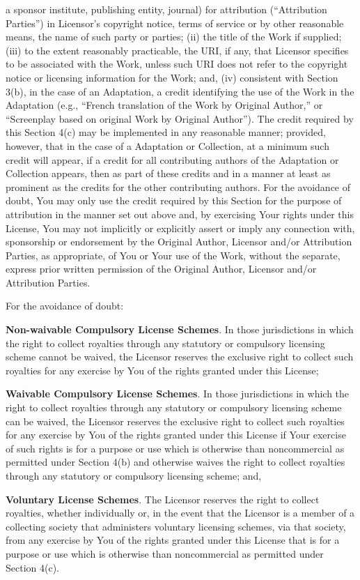 \begin{doclicense@enumerate}
a sponsor institute, publishing entity, journal) for
attribution (``Attribution Parties'') in Licensor's
copyright notice, terms of service or by other reasonable
means, the name of such party or parties; (ii) the title
of the Work if supplied; (iii) to the extent reasonably
practicable, the URI, if any, that Licensor specifies to
be associated with the Work, unless such URI does not
refer to the copyright notice or licensing information
for the Work; and, (iv) consistent with Section 3(b), in
the case of an Adaptation, a credit identifying the use
of the Work in the Adaptation (e.g., ``French translation
of the Work by Original Author,'' or ``Screenplay based on
original Work by Original Author''). The credit required
by this Section 4(c) may be implemented in any reasonable
manner; provided, however, that in the case of a
Adaptation or Collection, at a minimum such credit will
appear, if a credit for all contributing authors of the
Adaptation or Collection appears, then as part of these
credits and in a manner at least as prominent as the
credits for the other contributing authors. For the
avoidance of doubt, You may only use the credit required
by this Section for the purpose of attribution in the
manner set out above and, by exercising Your rights under
this License, You may not implicitly or explicitly assert
or imply any connection with, sponsorship or endorsement
by the Original Author, Licensor and/or Attribution
Parties, as appropriate, of You or Your use of the Work,
without the separate, express prior written permission of
the Original Author, Licensor and/or Attribution
Parties.
\item 
\par For the avoidance of doubt:
\begin{doclicense@enumerate}
\item \textbf{Non-waivable Compulsory License
Schemes}. In those jurisdictions in which the
right to collect royalties through any statutory or
compulsory licensing scheme cannot be waived, the
Licensor reserves the exclusive right to collect such
royalties for any exercise by You of the rights
granted under this License;
\item \textbf{Waivable Compulsory License
Schemes}. In those jurisdictions in which the
right to collect royalties through any statutory or
compulsory licensing scheme can be waived, the
Licensor reserves the exclusive right to collect such
royalties for any exercise by You of the rights
granted under this License if Your exercise of such
rights is for a purpose or use which is otherwise
than noncommercial as permitted under Section 4(b)
and otherwise waives the right to collect royalties
through any statutory or compulsory licensing scheme;
and,
\item \textbf{Voluntary License Schemes}. The
Licensor reserves the right to collect royalties,
whether individually or, in the event that the
Licensor is a member of a collecting society that
administers voluntary licensing schemes, via that
society, from any exercise by You of the rights
granted under this License that is for a purpose or
use which is otherwise than noncommercial as
permitted under Section 4(c).
\end{doclicense@enumerate}


\end{doclicense@enumerate}
